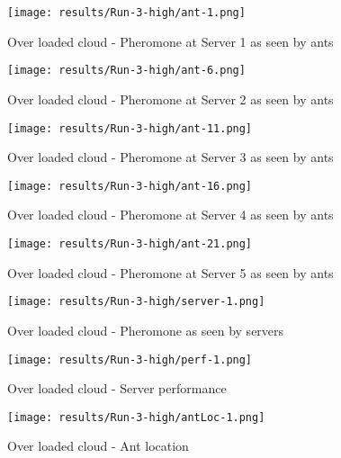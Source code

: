 \begin{figure}[!ht]
	\centering
		\texttt{[image: results/Run-3-high/ant-1.png]}
	\caption{Over loaded cloud - Pheromone at Server 1 as seen by ants}
	\label{fig:3serv-ant1-high}
\end{figure}

\begin{figure}
	\centering
		\texttt{[image: results/Run-3-high/ant-6.png]}
	\caption{Over loaded cloud - Pheromone at Server 2 as seen by ants}
	\label{fig:3serv-ant6-high}
\end{figure}

\begin{figure}
	\centering
		\texttt{[image: results/Run-3-high/ant-11.png]}
	\caption{Over loaded cloud - Pheromone at Server 3 as seen by ants}
	\label{fig:3serv-ant11-high}
\end{figure}

\begin{figure}
	\centering
		\texttt{[image: results/Run-3-high/ant-16.png]}
	\caption{Over loaded cloud - Pheromone at Server 4 as seen by ants}
	\label{fig:3serv-ant16-high}
\end{figure}

\begin{figure}
	\centering
		\texttt{[image: results/Run-3-high/ant-21.png]}
	\caption{Over loaded cloud - Pheromone at Server 5 as seen by ants}
	\label{fig:3serv-ant21-high}
\end{figure}

\begin{figure}
	\centering
		\texttt{[image: results/Run-3-high/server-1.png]}
	\caption{Over loaded cloud - Pheromone as seen by servers}
	\label{fig:3serv-pher-high}
\end{figure}

\begin{figure}
	\centering
		\texttt{[image: results/Run-3-high/perf-1.png]}
	\caption{Over loaded cloud - Server performance}
	\label{fig:3serv-perf-high}
\end{figure}

\begin{figure}
	\centering
		\texttt{[image: results/Run-3-high/antLoc-1.png]}
	\caption{Over loaded cloud - Ant location}
	\label{fig:3serv-antloc-high}
\end{figure}

